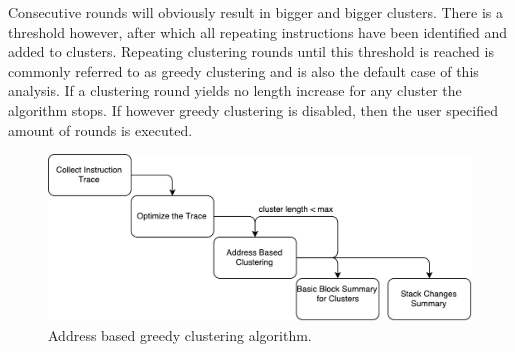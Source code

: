 \documentclass[10pt,twoside,a4paper,bibliography=totoc]{scrbook}
\begin{document}
Consecutive rounds will obviously result in bigger and bigger clusters. There is a threshold however, after which all repeating instructions have been identified and added to clusters.
Repeating clustering rounds until this threshold is reached is commonly referred to as greedy clustering and is also the default case of this analysis. If a clustering round yields no length increase for any cluster the algorithm stops.
If however greedy clustering is disabled, then the user specified amount of rounds is executed.


\begin{figure}[htb]
\centering
\includegraphics[scale=0.75]{images/ch3/clustering_algo.pdf}
\caption{Address based greedy clustering algorithm.}
\label{clu_algo}
\end{figure}
\end{document}
